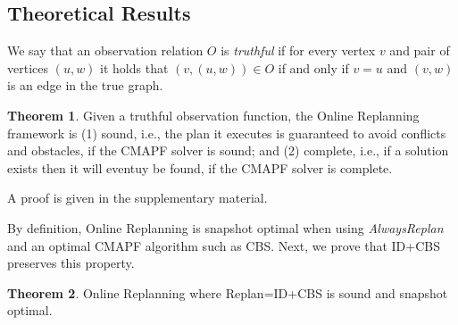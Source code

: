 \documentclass[letterpaper]{article} %
\def\
UrlFont{\rm}  %
\newcommand{\roni}[1]{\textbf{[\color{orange}RONI:#1]}}
\theoremstyle{definition}
\newtheorem{theorem}{Theorem}
\begin{document}

\subsection{Theoretical Results}

We say that an observation relation $O$ is \emph{truthful} if for every vertex $v$ and pair of vertices $(u,w)$ it holds that $(v,(u,w))\in O$ if and only if $v=u$ and $(v,w)$ is an edge in the true graph.
\begin{theorem}
Given a truthful observation function,
the Online Replanning framework is (1) sound, i.e., the plan it executes is guaranteed to avoid conflicts and obstacles, if the CMAPF solver is sound; and (2) complete, i.e., if a solution exists then it will eventuy be found, if the CMAPF solver is complete.
\end{theorem}
\noindent A proof is given in the supplementary material.


By definition, Online Replanning is snapshot optimal when using \emph{AlwaysReplan} and an optimal CMAPF algorithm such as CBS.
Next, we prove that ID+CBS preserves this property.
\begin{theorem}
   Online Replanning where Replan=ID+CBS is sound and snapshot optimal.
\end{theorem}
\end{document}
